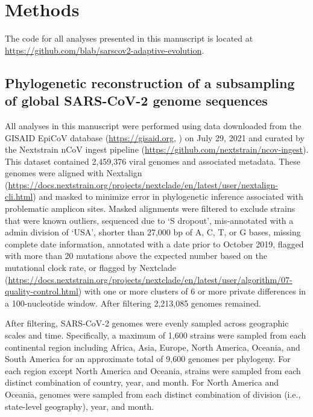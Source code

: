 \documentclass[11pt,oneside,letterpaper]{article}
\begin{document}
\section*{Methods}
\sloppy
The code for all analyses presented in this manuscript is located at \url{https://github.com/blab/sarscov2-adaptive-evolution}.

\subsection*{Phylogenetic reconstruction of a subsampling of global SARS-CoV-2 genome sequences}
All analyses in this manuscript were performed using data downloaded from the GISAID EpiCoV database (\url{https://gisaid.org}, \cite{Shu2017-ql}) on July 29, 2021 and curated by the Nextstrain nCoV ingest pipeline (\url{https://github.com/nextstrain/ncov-ingest}). 
This dataset contained 2,459,376 viral genomes and associated metadata. 
These genomes were aligned with Nextalign (\url{https://docs.nextstrain.org/projects/nextclade/en/latest/user/nextalign-cli.html}) and masked to minimize error in phylogenetic inference associated with problematic amplicon sites. 
Masked alignments were filtered to exclude strains that were known outliers, sequenced due to `S dropout', mis-annotated with a admin division of `USA', shorter than 27,000 bp of A, C, T, or G bases, missing complete date information, annotated with a date prior to October 2019, flagged with more than 20 mutations above the expected number based on the mutational clock rate, or flagged by Nextclade (\url{https://docs.nextstrain.org/projects/nextclade/en/latest/user/algorithm/07-quality-control.html}) with one or more clusters of 6 or more private differences in a 100-nucleotide window. 
After filtering 2,213,085 genomes remained.

After filtering, SARS-CoV-2 genomes were evenly sampled across geographic scales and time. Specifically, a maximum of 1,600 strains were sampled from each continental region including Africa, Asia, Europe, North America, Oceania, and South America for an approximate total of 9,600 genomes per phylogeny. 
For each region except North America and Oceania, strains were sampled from each distinct combination of country, year, and month. 
For North America and Oceania, genomes were sampled from each distinct combination of division (i.e., state-level geography), year, and month.
\end{document}
